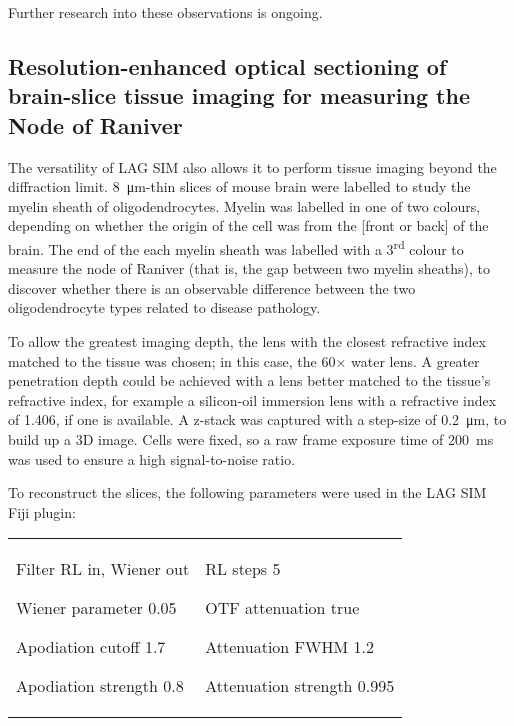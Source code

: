 Further research into these observations is ongoing. 


\subsection{Resolution-enhanced optical sectioning of brain-slice tissue imaging for measuring the Node of Raniver}
The versatility of LAG SIM also allows it to perform tissue imaging beyond the diffraction limit. 
\SI{8}{\micro\metre}-thin slices of mouse brain were labelled to study the myelin sheath of oligodendrocytes. 
Myelin was labelled in one of two colours, depending on whether the origin of the cell was from the [front or back] of the brain. 
The end of the each myelin sheath was labelled with a 3\textsuperscript{rd} colour to measure the node of Raniver (that is, the gap between two myelin sheaths), to discover whether there is an observable difference between the two oligodendrocyte types related to disease pathology. 

To allow the greatest imaging depth, the lens with the closest refractive index matched to the tissue was chosen; in this case, the 60$\times$ water lens. 
A greater penetration depth could be achieved with a lens better matched to the tissue's refractive index, for example a silicon-oil immersion lens with a refractive index of \num{1.406}, if one is available. 
A z-stack was captured with a step-size of \SI{0.2}{\micro\metre}, to build up a 3D image. 
Cells were fixed, so a raw frame exposure time of \SI{200}{\milli\second} was used to ensure a high signal-to-noise ratio. 

To reconstruct the slices, the following parameters were used in the LAG SIM Fiji plugin:\newline
\begin{tabular}{p{}p{}}
\begin{labelling}[margin={Attenuation strength}]
	\item[Filter] RL in, Wiener out
	\item[Wiener parameter] 0.05
	\item[Apodiation cutoff] 1.7
	\item[Apodiation strength] 0.8
\end{labelling} &
\begin{labelling}[margin={Attenuation strength}]
	\item[RL steps] 5
	\item[OTF attenuation] true
	\item[Attenuation FWHM] 1.2
	\item[Attenuation strength] 0.995 
\end{labelling} %
\end{tabular}

